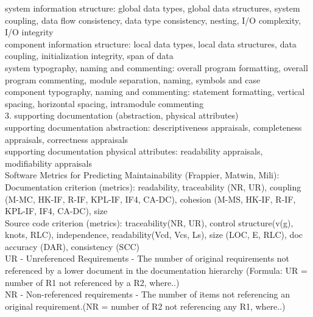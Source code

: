\documentclass{article}
\begin{document}
system information structure: global data types, global data structures, system coupling, data flow consistency, data type consistency, nesting, I/O complexity, I/O integrity\\

component information structure: local data types, local data structures, data coupling, initialization integrity, span of data \\

system typography, naming and commenting: overall program formatting, overall program commenting, module separation, naming, symbols and case\\

component typography, naming and commenting: statement formatting, vertical spacing, horizontal spacing, intramodule commenting\\

3. supporting documentation (abstraction, physical attributes)\\
 
supporting documentation abstraction: descriptiveness appraisals, completeness appraisals, correctness appraisals\\

supporting documentation physical attributes: readability appraisals, modifiability appraisals\\



\noindent Software Metrics for Predicting Maintainability (Frappier, Matwin, Mili): \\

Documentation criterion (metrics): readability, traceability (NR, UR), coupling (M-MC, HK-IF, R-IF, KPL-IF, IF4, CA-DC), cohesion (M-MS, HK-IF, R-IF, KPL-IF, IF4, CA-DC), size\\

Source code criterion (metrics): traceability(NR, UR), control structure(v(g), knots, RLC), independence, readability(Vcd, Vcs, Ls), size (LOC, E, RLC), doc accuracy (DAR), consistency (SCC)\\

UR - Unreferenced Requirements - The  number  of  original  requirements  not  referenced  by  a  lower  document  in  the  documentation hierarchy (Formula: UR = number of R1 not referenced by a R2, where..)\\

NR - Non-referenced requirements - The number of items not referencing an original requirement.(NR = number of R2 not referencing any R1, where..)\\
\end{document}
